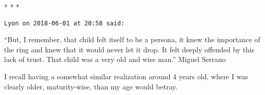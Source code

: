 
\begin{center}* * *\end{center}

\begin{footnotesize}\begin{sffamily}

\texttt{Lyon on 2018-06-01 at 20:58 said:}

“But, I remember, that child felt itself to be a persona, it knew the importance of the ring and knew that it would
never let it drop. It felt deeply offended by this lack of trust. That child was a very old and wise man.” Miguel
Serrano

I recall having a somewhat similar realization around 4 years old, where I was clearly older, maturity-wise, than my age
would betray.

\hfill

\end{sffamily}\end{footnotesize}
